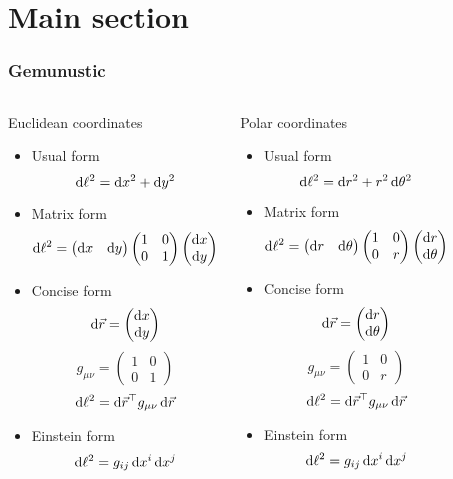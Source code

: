 \documentclass[mathserif]{beamer}
\date{}
\author{xdptdr}
\begin{document}
\section{Main section}
\begin{frame}\frametitle{Gemunustic}

\newcommand\euclideancoordinatesblock{
\begin{block}{Euclidean coordinates}
\begin{itemize}
\item Usual form
$$\dif \ell^2 = \dif x^2 + \dif y^2$$
\item Matrix form
$$\dif \ell^2 =
\begin{pmatrix}\dif x&\dif y\end{pmatrix}
\begin{pmatrix}1&0\\0&1\end{pmatrix}
\begin{pmatrix}\dif x\\\dif y\end{pmatrix}
$$
\item Concise form
$$\dif\vec r=\begin{pmatrix}\dif x\\\dif y\end{pmatrix}$$
$$g_{\mu\nu}=\begin{pmatrix}1&0\\0&1\end{pmatrix}$$
$$\dif \ell^2 = \dif\vec r^\top g_{\mu\nu} \dif\vec r $$
\item Einstein form
$$\dif \ell^2 = g_{ij}\dif x^i\dif x^j$$
\end{itemize}
\end{block}
}

\newcommand\polarcoordinatesblock{
\begin{block}{Polar coordinates}
\begin{itemize}
\item Usual form
$$\dif \ell^2 = \dif r^2 + r^2\dif\theta^2$$
\item Matrix form
$$\dif \ell^2 =
\begin{pmatrix}\dif r&\dif\theta\end{pmatrix}
\begin{pmatrix}1&0\\0&r\end{pmatrix}
\begin{pmatrix}\dif r\\\dif\theta\end{pmatrix}
$$
\item Concise form
$$\dif\vec r=\begin{pmatrix}\dif r\\\dif\theta\end{pmatrix}$$
$$g_{\mu\nu}=\begin{pmatrix}1&0\\0&r\end{pmatrix}$$
$$\dif \ell^2 = \dif\vec r^\top g_{\mu\nu} \dif\vec r $$
\item Einstein form
$$\dif \ell^2 = g_{ij}\dif x^i\dif x^j$$
\end{itemize}
\end{block}
}

\begin{columns}[c]
\euclideancoordinatesblock
\polarcoordinatesblock
\end{columns}
\end{frame}
\end{document}
